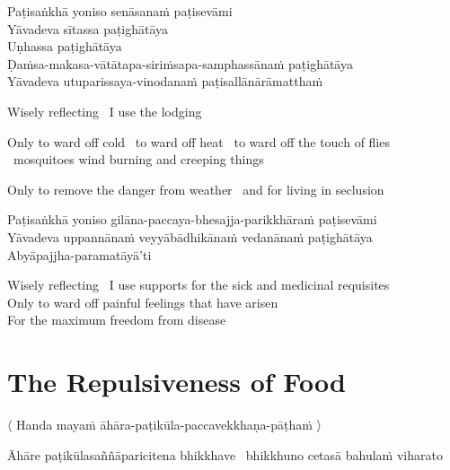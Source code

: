 Paṭisaṅkhā yoniso senāsanaṁ paṭisevāmi\\
Yāvadeva sītassa paṭighātāya\\
Uṇhassa paṭighātāya\\
Ḍaṁsa-makasa-vātātapa-siriṁsapa-samphassānaṁ paṭighātāya\\
Yāvadeva utuparissaya-vinodanaṁ paṭisallānārāmatthaṁ

\begin{english-keepwith}
  Wisely reflecting \breathmark\ I use the lodging
\begin{english-hangtogether}
  Only to ward off cold \breathmark\ to ward off heat \breathmark\ to ward off the touch of flies \breathmark\ mosquitoes wind burning and creeping things
\end{english-hangtogether}
\begin{english-hangtogether}
  Only to remove the danger from weather \breathmark\ and for living in seclusion
\end{english-hangtogether}
\end{english-keepwith}



Paṭisaṅkhā yoniso gilāna-paccaya-bhesajja-parikkhāraṁ paṭisevāmi\\
Yāvadeva uppannānaṁ veyyābādhikānaṁ vedanānaṁ paṭighātāya\\
Abyāpajjha-paramatāyā'ti

\begin{english-verses}
  Wisely reflecting \breathmark\ I use supports for the sick and medicinal requisites\\
  Only to ward off painful feelings that have arisen\\
  For the maximum freedom from disease
\end{english-verses}

\suttaRef{[MN 2]}


\section{The Repulsiveness of Food}
\label{repulsiveness-of-food}

\begin{leader}
  〈 Handa mayaṁ āhāra-paṭikūla-paccavekkhaṇa-pāṭhaṁ 〉
\end{leader}

\begin{pali-hang}
Āhāre paṭikūlasaññāparicitena bhikkhave \breathmark\ bhikkhuno cetasā bahulaṁ viharato
\end{pali-hang}

